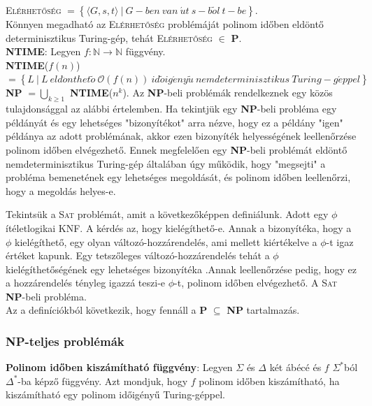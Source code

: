 \documentclass[margin=0px]{article}
\begin{document}
\textsc{Elérhetőség} $= \left\{\langle G, s, t \rangle \ | \ G-ben \ van \ \acute{u}t \ s-b\tilde{o}l \ t-be\right\}$.\\

Könnyen megadható az \textsc{Elérhetőség} problémáját polinom időben eldöntő determinisztikus Turing-gép, tehát
\textsc{Elérhetőség} $\in$ \textbf{P}.\\

\noindent \textbf{NTIME}: Legyen $f : \mathbb{N} \to \mathbb{N}$ függvény.\\ \textbf{NTIME}($f(n)$) $= \left\{L \ | \ L \ eld\ddot{o}nthet\tilde{o} \ \mathcal{O}(f(n)) \ id\tilde{o}ig\acute{e}ny\tilde{u} \ nemdeterminisztikus\ Turing-g\acute{e}ppel \right\}$\\

\noindent \textbf{NP} $=\bigcup_{k \geq 1}$ \textbf{NTIME}($n^{k}$).
Az \textbf{NP}-beli problémák rendelkeznek egy közös tulajdonsággal az alábbi értelemben.
Ha tekintjük egy \textbf{NP}-beli probléma egy példányát és egy lehetséges "bizonyítékot"
arra nézve, hogy ez a példány "igen" példánya az adott problémának,
akkor ezen bizonyíték helyességének leellenőrzése polinom időben elvégezhető.
Ennek megfelelően egy \textbf{NP}-beli problémát eldöntő nemdeterminisztikus Turing-gép
általában úgy működik, hogy "megsejti" a probléma bemenetének egy lehetséges megoldását,
és polinom időben leellenőrzi, hogy a megoldás helyes-e.

Tekintsük a \textsc{Sat} problémát, amit a következőképpen definiálunk. Adott egy $\phi$ ítéletlogikai KNF.
A kérdés az, hogy kielégíthető-e. Annak a bizonyítéka, hogy	a $\phi$ kielégíthető, egy olyan változó-hozzárendelés,
ami mellett kiértékelve a $\phi$-t igaz értéket kapunk. Egy tetszőleges változó-hozzárendelés tehát a $\phi$
kielégíthetőségének egy lehetséges bizonyítéka .Annak leellenőrzése pedig, hogy ez a
hozzárendelés tényleg igazzá teszi-e $\phi$-t, polinom időben elvégezhető. A \textsc{Sat}
\textbf{NP}-beli probléma.\\

\noindent Az a definíciókból következik, hogy fennáll a \textbf{P} $\subseteq$ \textbf{NP} tartalmazás.

\subsubsection{NP-teljes problémák}

\noindent \textbf{Polinom időben kiszámítható függvény}: Legyen $\Sigma$ és $\Delta$ két ábécé és $f$ $\Sigma^{*}$ból
$\Delta^{*}$-ba képző függvény. Azt mondjuk, hogy $f$ polinom időben kiszámítható, ha kiszámítható egy polinom
időigényű Turing-géppel.\\
\end{document}
